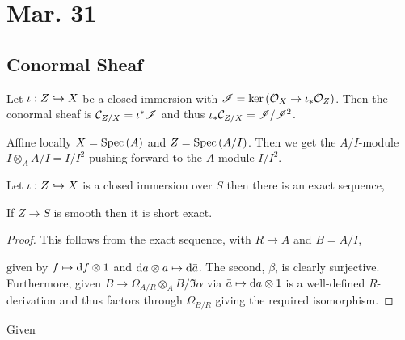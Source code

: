 \documentclass[12pt]{article}
\begin{document}
\section{Mar. 31}

\subsection{Conormal Sheaf}

\begin{defn}
Let $\iota : Z \hookrightarrow X$ be a closed immersion with $\mathscr{I} = \ker{(\mathcal{O}_{X} \to \iota_* \mathcal{O}_{Z})}$. Then the conormal sheaf is $\mathcal{C}_{Z/X} = \iota^* \mathscr{I}$ and thus $\iota_* \mathcal{C}_{Z/X} = \mathscr{I} / \mathscr{I}^2$.
\end{defn}

\begin{rmk}
Affine locally $X = \mathrm{Spec}\left( A \right)$ and $Z = \mathrm{Spec}\left( A/I \right)$. Then we get the $A/I$-module $I \otimes_A A/I = I/I^2$ pushing forward to the $A$-module $I/I^2$.
\end{rmk}

\begin{prop}
Let $\iota : Z \hookrightarrow X$ is a closed immersion over $S$ then there is an exact sequence,
\begin{center}
\end{center}
If $Z \to S$ is smooth then it is short exact.
\end{prop}

\begin{proof}
This follows from the exact sequence, with $R \to A$ and $B = A/I$,
\begin{center}
\end{center}
given by $f \mapsto \mathrm{d}{f} \otimes 1$ and $\mathrm{d}{a} \otimes a \mapsto \mathrm{d}{\bar{a}}$. The second, $\beta$, is clearly surjective. Furthermore, given $B \to \Omega_{A/R} \otimes_A B / \Im{\alpha}$ via $\bar{a} \mapsto \mathrm{d}{a} \otimes 1$ is a well-defined $R$-derivation and thus factors through $\Omega_{B/R}$ giving the required isomorphism.
\end{proof}

\begin{prop}
Given 
\end{prop}
\end{document}
